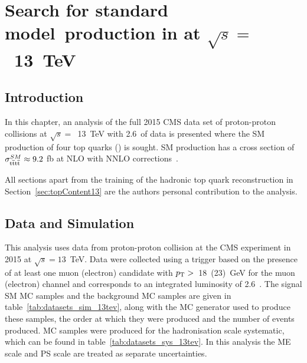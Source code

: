 \chapter{Search for standard model~\tttt production in \runtwo at $\sqrt{s} =$~13~TeV \label{c:Run2}}
\section{Introduction}
In this chapter, an analysis of the full 2015 CMS data set of proton-proton collisions at $\sqrt{s} =$~13~TeV with 2.6~\fbinv of data is presented where the SM production of four top quarks (\tttt) is sought. SM \tttt production has a cross section of $\sigma_{{\mathrm{t}\overline{\mathrm{t}}\mathrm{t}\overline{\mathrm{t}}}}^{SM}  \approx 9.2$ fb at NLO with NNLO corrections~\cite{Alwall2014,Bevilacqua2012}. 

All sections apart from the training of the hadronic top quark reconstruction in Section~\ref{sec:topContent13} are the authors personal contribution to the analysis.

\section{Data and Simulation}
\label{sec:datasimulation13}
This analysis uses data from proton-proton collision at the CMS experiment in 2015 at $\sqrt{s}=13$~TeV.
Data were collected using a trigger based on the presence of at least one muon (electron) candidate with $p_{\mathrm{T}} > $~18~(23)~GeV for the muon (electron) channel and corresponds to an integrated luminosity of 2.6~\fbinv .
The signal SM \tttt MC samples and the background MC samples are given in table~\ref{tab:datasets_sim_13tev}, along with the MC generator used to produce these samples, the order at which they were produced and the number of events produced. MC samples were produced for the hadronisation scale systematic, which can be found in table~\ref{tab:datasets_sys_13tev}. In this analysis the ME scale and PS scale are treated as separate uncertainties.

